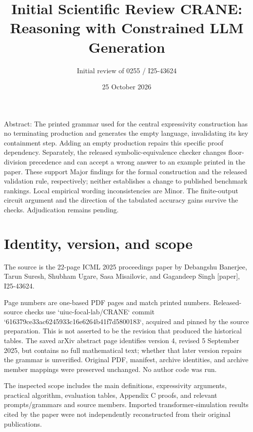 \documentclass[10pt]{article}
\title{Initial Scientific Review
CRANE: Reasoning with Constrained LLM Generation}
\author{Initial review of 0255 / I25-43624}
\date{25 October 2026}
\begin{document}
\maketitle
Abstract: The printed grammar used for the central expressivity construction has no terminating production and generates the empty language, invalidating its key containment step. Adding an empty production repairs this specific proof dependency. Separately, the released symbolic-equivalence checker changes floor-division precedence and can accept a wrong answer to an example printed in the paper. These support Major findings for the formal construction and the released validation rule, respectively; neither establishes a change to published benchmark rankings. Local empirical wording inconsistencies are Minor. The finite-output circuit argument and the direction of the tabulated accuracy gains survive the checks. Adjudication remains pending.\par
\section*{Identity, version, and scope}
The source is the 22-page ICML 2025 proceedings paper by Debangshu Banerjee, Tarun Suresh, Shubham Ugare, Sasa Misailovic, and Gagandeep Singh [paper], I25-43624.\par
Page numbers are one-based PDF pages and match printed numbers. Released-source checks use `uiuc-focal-lab/CRANE` commit `616379ce33ac6245933c16e6264b41f7d5800183`, acquired and pinned by the source preparation. This is not asserted to be the revision that produced the historical tables. The saved arXiv abstract page identifies version 4, revised 5 September 2025, but contains no full mathematical text; whether that later version repairs the grammar is unverified. Original PDF, manifest, archive identities, and archive member mappings were preserved unchanged. No author code was run.\par
The inspected scope includes the main definitions, expressivity arguments, practical algorithm, evaluation tables, Appendix C proofs, and relevant prompts/grammars and source members. Imported transformer-simulation results cited by the paper were not independently reconstructed from their original publications.\par
\end{document}
